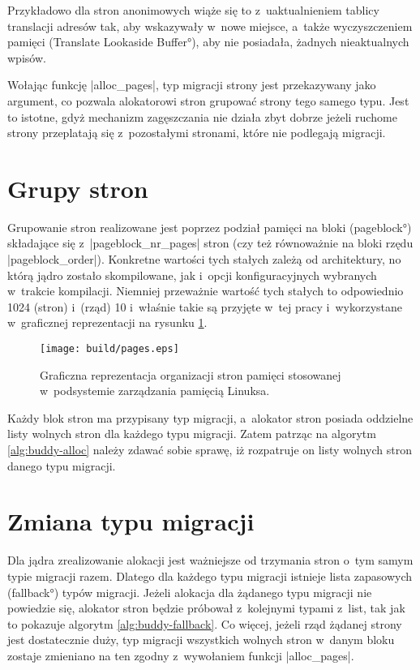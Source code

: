 Przykładowo dla stron anonimowych wiąże się to z~uaktualnieniem
tablicy translacji adresów tak, aby wskazywały w~nowe miejsce, a~także
wyczyszczeniem pamięci  (\ang{Translate Lookaside Buffer}), aby nie
posiadała, żadnych nieaktualnych wpisów.

Wołając funkcję \code|alloc_pages|, typ migracji strony jest
przekazywany jako argument, co pozwala alokatorowi stron grupować
strony tego samego typu.  Jest to istotne, gdyż mechanizm zagęszczania
nie działa zbyt dobrze jeżeli ruchome strony przeplatają się
z~pozostałymi stronami, które nie podlegają migracji.


\section{Grupy stron}

Grupowanie stron realizowane jest poprzez podział pamięci na bloki
(\ang{pageblock}) składające się z~\code|pageblock_nr_pages| stron
(czy też równoważnie na bloki rzędu \code|pageblock_order|).
Konkretne wartości tych stałych zależą od architektury, no którą jądro
zostało skompilowane, jak i~opcji konfiguracyjnych wybranych w~trakcie
kompilacji.  Niemniej przeważnie wartość tych stałych to odpowiednio
1024 (stron) i~(rząd) 10 i~właśnie takie są przyjęte w~tej pracy
i~wykorzystane w~graficznej reprezentacji na rysunku \ref{fig:pages}.

\begin{figure}[tbp]
\begin{center}
\texttt{[image: build/pages.eps]}
\end{center}
\caption[Organizacja pamięci w~Linuksie.]{Graficzna reprezentacja
  organizacji stron pamięci stosowanej w~podsystemie zarządzania
  pamięcią Linuksa.}
\label{fig:pages}
\end{figure}

Każdy blok stron ma przypisany typ migracji, a~alokator stron posiada
oddzielne listy wolnych stron dla każdego typu migracji.  Zatem
patrząc na algorytm \ref{alg:buddy-alloc} należy zdawać sobie sprawę,
iż rozpatruje on listy wolnych stron danego typu migracji.

\section{Zmiana typu migracji}\label{sec:type-change}

Dla jądra zrealizowanie alokacji jest ważniejsze od trzymania stron
o~tym samym typie migracji razem.  Dlatego dla każdego typu migracji
istnieje lista zapasowych (\ang{fallback}) typów migracji.  Jeżeli
alokacja dla żądanego typu migracji nie powiedzie się, alokator stron
będzie próbował z~kolejnymi typami z~list, tak jak to pokazuje
algorytm \ref{alg:buddy-fallback}.  Co więcej, jeżeli rząd żądanej
strony jest dostatecznie duży, typ migracji wszystkich wolnych stron
w~danym bloku zostaje zmieniano na ten zgodny z~wywołaniem funkcji
\code|alloc_pages|.

